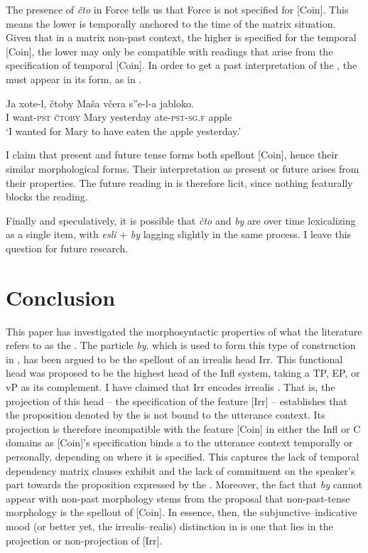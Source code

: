 \documentclass[output=paper,modfonts,newtxmath,hidelinks,]{langscibook}
\begin{document}
\noindent The presence of \textit{čto} in Force tells us that Force is not specified for [Coin]. This means the lower  is temporally anchored to the time of the matrix situation. Given that in a matrix non-past context, the higher  is specified for the temporal [Coin], the lower  may only be compatible with readings that arise from the specification of temporal [Coin]. In order to get a past interpretation of the  , the  must appear in its  form, as in .

\ea \label{10:ex34}
\gll Ja xote-l, čtoby Maša včera s”e-l-a jabloko.\\
     I want\textsc{-pst} \textsc{čtoby} Mary yesterday ate\textsc{-pst-sg.f} apple \\
\glt `I wanted for Mary to have eaten the apple yesterday.’
\z

\noindent I claim that  present and future tense forms both spellout [Coin], hence their similar morphological forms. Their interpretation as present or future arises from their  properties. The future reading in  is therefore licit, since nothing featurally blocks the reading.

Finally and speculatively, it is possible that \textit{čto} and \textit{by} are over time lexicalizing as a single item, with \textit{esli} + \textit{by} lagging slightly in the same process. I leave this question for future research.

\section{Conclusion}\label{10:s6}

This paper has investigated the morphosyntactic properties of what the literature refers to as the  . The particle \textit{by}, which is used to form this type of construction in , has been argued to be the spellout of an irrealis head Irr. This functional head was proposed to be the highest head of the  Infl system, taking a TP, EP, or vP as its complement. I have claimed that Irr encodes irrealis . That is, the projection of this head -- the specification of the feature [Irr] -- establishes that the proposition denoted by the  is not bound to the utterance context. Its projection is therefore incompatible with the feature [Coin] in either the Infl or C domains as [Coin]’s specification binds a  to the utterance context temporally or personally, depending on where it is specified. This captures the lack of temporal dependency matrix  clauses exhibit and the lack of commitment on the speaker’s part towards the proposition expressed by the  . Moreover, the fact that \textit{by} cannot appear with non-past morphology stems from the proposal that non-past-tense morphology is the spellout of [Coin]. In essence, then, the subjunctive--indicative mood (or better yet, the irrealis--realis) distinction in  is one that lies in the projection or non-projection of [Irr].
\end{document}
